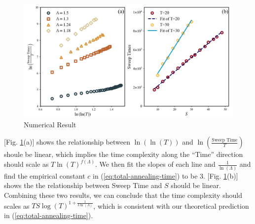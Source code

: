 \documentclass[twocolumn,superscriptaddress,english,showpacs,longbibliography]{revtex4-2}
\begin{document}
\begin{figure}[h]
    \centering
    \includegraphics[width=\columnwidth,keepaspectratio]{../notes/images/MainNumericalResult.png}
    \caption{Numerical Result}
    \label{fig:main-numerical-result}
\end{figure}

[Fig. \ref{fig:main-numerical-result}(a)] shows the relationship between
$\ln(\ln(T))$ and $\ln(\frac{\text{Sweep Time}}{T})$ shoule be linear, which implies 
the time complexity along the ``Time'' direction should scale as $T\ln(T)^{f(\Lambda)}$. 
We then fit the slopes of each line and $\frac{1}{\ln(\Lambda)}$ and find the 
empirical constant $c$ in (\ref{eq:total-annealing-time}) to be $3$. [Fig. \ref{fig:main-numerical-result}(b)] shows 
the the relationship between Sweep Time and $S$ should be linear. Combining these two results, 
we can conclude that the time complexity should scales as $TS\log(T)^{1+\frac{1}{3\ln(\Lambda)}}$, 
which is consistent with our theoretical prediction in (\ref{eq:total-annealing-time}).
\end{document}
